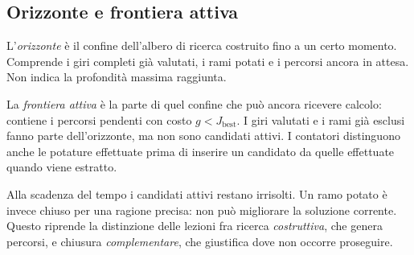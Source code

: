 \subsection{Orizzonte e frontiera attiva}
L'\emph{orizzonte} è il confine dell'albero di ricerca costruito fino a un
certo momento. Comprende i giri completi già valutati, i rami potati e i
percorsi ancora in attesa. Non indica la profondità massima raggiunta.

La \emph{frontiera attiva} è la parte di quel confine che può ancora ricevere
calcolo: contiene i percorsi pendenti con costo $g<J_{\mathrm{best}}$.
I giri valutati e i rami già esclusi fanno parte dell'orizzonte, ma non
sono candidati attivi. I contatori distinguono anche le potature effettuate
prima di inserire un candidato da quelle effettuate quando viene estratto.

Alla scadenza del tempo i candidati attivi restano irrisolti. Un ramo potato
è invece chiuso per una ragione precisa: non può migliorare la soluzione
corrente. Questo riprende la distinzione delle lezioni fra ricerca
\emph{costruttiva}, che genera percorsi, e chiusura \emph{complementare},
che giustifica dove non occorre proseguire.
